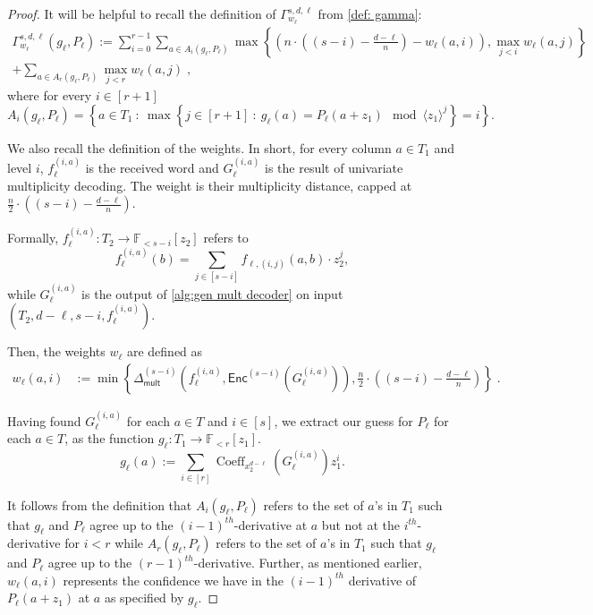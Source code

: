 \documentclass{theoretics}
\def\Field{\mathbb{F}}
\let\F\Field
\def\inbrace#1{\left\{ #1 \right\}}
\def\setdef#1#2{\inbrace{ #1 \ \colon \ #2}}      %
\newcommand{\enc}{{\mathsf{Enc}}}
\newcommand{\coeff}{\operatorname{Coeff}}
\newcommand{\Delm}{\Delta_{\mathsf{mult}}}
\begin{document}
	\begin{proof}	
		It will be helpful to recall the definition of $\Gamma_{w_\ell}^{s, d, \ell}$ from \cref{def: gamma}:
		\begin{multline*}
		\Gamma_{w_\ell}^{s, d, \ell}\left(g_\ell, P_\ell\right)  := \sum_{i = 0}^{r-1} \sum_{a
			\in A_i\left(g_\ell, P_\ell\right)} \max
		\left\{\left(n\cdot \left(\left(s-i\right) -
		\frac{d-\ell}n\right) - w_\ell\left(a,i\right)\right),
		\max_{j < i} w_\ell(a, j) \right\}\\
		+ \sum_{a \in A_r\left(g_\ell,
			P_\ell\right)} \max_{j < r} w_\ell(a,
		j)\;, 
        \end{multline*}
		where for every $i \in [r+1]$
		\[
		A_i\left(g_\ell,P_\ell\right)=\setdef{a\in T_1}{\max{\setdef{j\in [r+1]}{g_\ell(a)=P_\ell(a+z_1) \mod \langle z_1\rangle^{j}}}=i}.
		\]
		
		We also recall the definition of the weights. In short, for every column $a \in T_1$ and level $i$, $f_{\ell}^{\left(i, a\right)}$ is the received word and $G_\ell^{(i,a)}$ is the result of univariate multiplicity decoding. The weight is their multiplicity distance, capped at $\frac{n}2\cdot((s-i)-\frac{d-\ell}n)$.
		
		Formally, $f_\ell^{(i,a)}\colon T_2 \to \F_{< s-i}[z_2]$ refers to 
		\[f_{\ell}^{\left(i, a\right)} \left(b\right) = \sum_{j \in
			[s-i]} f_{\ell, \left(i, j\right)}\left(a, b\right)
		\cdot z_2^{j},\]
		while $G_\ell^{(i,a)}$ is the output of \cref{alg:gen mult decoder} on
		input $\left(T_2,  d-\ell, s-i, f_{\ell}^{\left(i,
			a\right)}\right)$.
		
		Then, the weights $w_\ell$ are defined as
		\begin{align*}
			w_\ell(a,i) &:= \min
			\left\{\Delm^{\left(s-i\right)}\left(f_\ell^{\left(i,
				a\right)} , \enc^{(s-i)}\left(G_\ell^{\left(i, a\right)}\right) \right), \frac{n}2\cdot\left((s-i)-\frac{d-\ell}n\right)\right\}\;.
		\end{align*}    
		
		Having found $G_\ell^{(i,a)}$ for each $a \in T$ and $i \in [s]$, we extract our guess for $P_{\ell}$ for each $a \in T$, as the function $g_\ell \colon T_1 \to \F_{<r}[z_1]$.
		\[g_\ell\left(a\right) := \sum_{i \in [r]}
		\coeff_{x_2^{d-\ell}}\left(G_{\ell}^{\left(i,
			a\right)}\right)z_1^{i}.\]
		
		It follows from the definition that $A_i\left(g_\ell,P_\ell\right)$
		refers to the set of $a$'s in $T_1$ such that $g_\ell$ and $P_\ell$
		agree up to the $(i-1)^{th}$-derivative at $a$ but not at the
		$i^{th}$-derivative for $i <r$ while $A_r\left(g_\ell,P_\ell\right)$
		refers to the set of $a$'s in $T_1$ such that $g_\ell$ and $P_\ell$
		agree up to the $(r-1)^{th}$-derivative. Further, as mentioned earlier, $w_\ell(a,i)$ represents the confidence we have in the $(i-1)^{th}$ derivative of $P_\ell(a+z_1)$ at $a$ as specified by $g_\ell$.
		

\end{proof}
\end{document}
